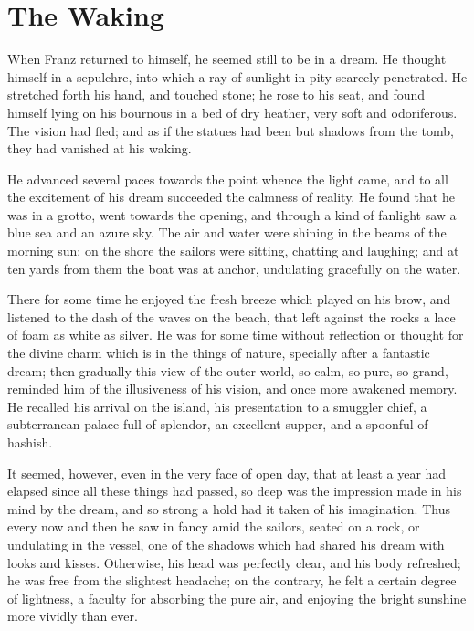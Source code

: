 \chapter{The Waking}

When Franz returned to himself, he seemed still to be in a dream. He
thought himself in a sepulchre, into which a ray of sunlight in pity
scarcely penetrated. He stretched forth his hand, and touched stone; he
rose to his seat, and found himself lying on his bournous in a bed of
dry heather, very soft and odoriferous. The vision had fled; and as if
the statues had been but shadows from the tomb, they had vanished at
his waking.

He advanced several paces towards the point whence the light came, and
to all the excitement of his dream succeeded the calmness of reality.
He found that he was in a grotto, went towards the opening, and through
a kind of fanlight saw a blue sea and an azure sky. The air and water
were shining in the beams of the morning sun; on the shore the sailors
were sitting, chatting and laughing; and at ten yards from them the
boat was at anchor, undulating gracefully on the water.

There for some time he enjoyed the fresh breeze which played on his
brow, and listened to the dash of the waves on the beach, that left
against the rocks a lace of foam as white as silver. He was for some
time without reflection or thought for the divine charm which is in the
things of nature, specially after a fantastic dream; then gradually
this view of the outer world, so calm, so pure, so grand, reminded him
of the illusiveness of his vision, and once more awakened memory. He
recalled his arrival on the island, his presentation to a smuggler
chief, a subterranean palace full of splendor, an excellent supper, and
a spoonful of hashish.

It seemed, however, even in the very face of open day, that at least a
year had elapsed since all these things had passed, so deep was the
impression made in his mind by the dream, and so strong a hold had it
taken of his imagination. Thus every now and then he saw in fancy amid
the sailors, seated on a rock, or undulating in the vessel, one of the
shadows which had shared his dream with looks and kisses. Otherwise,
his head was perfectly clear, and his body refreshed; he was free from
the slightest headache; on the contrary, he felt a certain degree of
lightness, a faculty for absorbing the pure air, and enjoying the
bright sunshine more vividly than ever.

